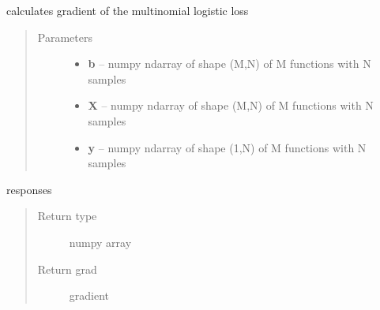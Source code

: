 \documentclass[letterpaper,10pt,english]{sphinxmanual}
\begin{document}
\begin{fulllineitems}
\label{regression:regression.mlogit_gradient}
calculates gradient of the multinomial logistic loss
\begin{quote}\begin{description}
\item[{Parameters}] \leavevmode\begin{itemize}
\item {} 
\textbf{b} -- numpy ndarray of shape (M,N) of M functions with N samples

\item {} 
\textbf{X} -- numpy ndarray of shape (M,N) of M functions with N samples

\item {} 
\textbf{y} -- numpy ndarray of shape (1,N) of M functions with N samples

\end{itemize}

\end{description}\end{quote}

responses
\begin{quote}\begin{description}
\item[{Return type}] \leavevmode
numpy array

\item[{Return grad}] \leavevmode
gradient

\end{description}\end{quote}

\end{fulllineitems}

\end{document}
